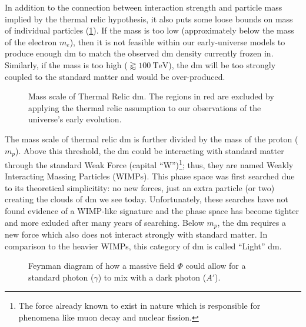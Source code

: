 In addition to the connection between interaction strength and particle mass implied by the thermal
relic hypothesis, it also puts some loose bounds on mass of individual particles
(\cref{fig:dm-mass-scale}). If the mass is too low (approximately below the mass of the electron
$m_e$), then it is not feasible within our early-universe models to produce enough \ac{dm} to
match the observed \ac{dm} density currently frozen in. Similarly, if the mass is too high
($\gtrapprox 100~\text{TeV}$), the \ac{dm} will be too strongly coupled to the standard matter and
would be over-produced. 

\begin{figure}
  \centering
  
  \caption{Mass scale of Thermal Relic \ac{dm}.
    The regions in red are excluded by applying the thermal relic assumption
    to our observations of the universe's early evolution.}
  \label{fig:dm-mass-scale}
\end{figure}

The mass scale of thermal relic \ac{dm} is further divided by the mass of the proton ($m_p$).
Above this threshold, the \ac{dm} could be interacting with standard matter through the standard
Weak Force (capital ``W'')\footnote{ The force already known to exist in nature which is
  responsible for phenomena like muon decay and nuclear fission. }; thus, they are named Weakly
Interacting Massing Particles (WIMPs). This phase space was first searched due to its theoretical
simplicitity: no new forces, just an extra particle (or two) creating the clouds of \ac{dm} we see
today. Unfortunately, these searches have not found evidence of a WIMP-like
signature\cite{supercdms-2018,damic-2020,xenon1t-2018} and the phase space has become tighter and
more exluded after many years of searching. Below $m_p$, the \ac{dm} requires a new force
which also does not interact strongly with standard matter. In comparison to the heavier WIMPs,
this category of \ac{dm} is called ``Light'' \ac{dm}.

\begin{figure}
  \centering
  \caption{Feynman diagram of how a massive field $\Phi$ could allow for a standard photon ($\gamma$)
    to mix with a dark photon ($A'$).}
  \label{fig:photon-mixing}
\end{figure}

